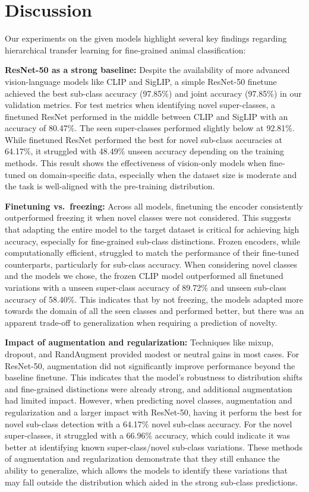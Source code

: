 \documentclass{article}
\begin{document}
\section{Discussion}
Our experiments on the given models highlight several key findings regarding hierarchical transfer learning for fine-grained animal classification:

\textbf{ResNet-50 as a strong baseline:} Despite the availability of more advanced vision-language models like CLIP and SigLIP, a simple ResNet-50 finetune achieved the best sub-class accuracy (97.85\%) and joint accuracy (97.85\%) in our validation metrics. For test metrics when identifying novel super-classes, a finetuned ResNet performed in the middle between CLIP and SigLIP with an accuracy of 80.47\%. The seen super-classes performed slightly below at 92.81\%. While finetuned ResNet performed the best for novel sub-class accuracies at 64.17\%, it struggled with 48.49\% unseen accuracy depending on the training methods. This result shows the effectiveness of vision-only models when fine-tuned on domain-specific data, especially when the dataset size is moderate and the task is well-aligned with the pre-training distribution.

\textbf{Finetuning vs.\ freezing:} Across all models, finetuning the encoder consistently outperformed freezing it when novel classes were not considered. This suggests that adapting the entire model to the target dataset is critical for achieving high accuracy, especially for fine-grained sub-class distinctions. Frozen encoders, while computationally efficient, struggled to match the performance of their fine-tuned counterparts, particularly for sub-class accuracy. When considering novel classes and the models we chose, the frozen CLIP model outperformed all finetuned variations with a unseen super-class accuracy of 89.72\% and unseen sub-class accuracy of 58.40\%. This indicates that by not freezing, the models adapted more towards the domain of all the seen classes and performed better, but there was an apparent trade-off to generalization when requiring a prediction of novelty.

\textbf{Impact of augmentation and regularization:} Techniques like mixup, dropout, and RandAugment provided modest or neutral gains in most cases. For ResNet-50, augmentation did not significantly improve performance beyond the baseline finetune. This indicates that the model's robustness to distribution shifts and fine-grained distinctions were already strong, and additional augmentation had limited impact. However, when predicting novel classes, augmentation and regularization and a larger impact with ResNet-50, having it perform the best for novel sub-class detection with a 64.17\% novel sub-class accuracy. For the novel super-classes, it struggled with a 66.96\% accuracy, which could indicate it was better at identifying known super-class/novel sub-class variations. These methods of augmentation and regularization demonstrate that they still enhance the ability to generalize, which allows the models to identify these variations that may fall outside the distribution which aided in the strong sub-class predictions.
\end{document}
